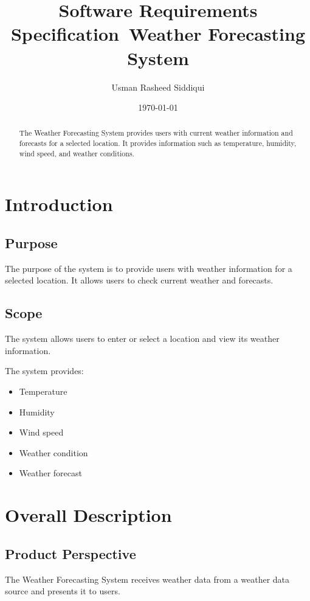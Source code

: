 \documentclass[12pt,a4paper]{article}
\title{Software Requirements Specification\
Weather Forecasting System}
\author{Usman Rasheed Siddiqui}
\date{\today}
\begin{document}
\maketitle

\begin{abstract}
The Weather Forecasting System provides users with current weather
information and forecasts for a selected location. It provides information
such as temperature, humidity, wind speed, and weather conditions.
\end{abstract}

\section{Introduction}

\subsection{Purpose}

The purpose of the system is to provide users with weather information
for a selected location. It allows users to check current weather and
forecasts.

\subsection{Scope}

The system allows users to enter or select a location and view its
weather information.

The system provides:

\begin{itemize}
\item Temperature
\item Humidity
\item Wind speed
\item Weather condition
\item Weather forecast
\end{itemize}

\section{Overall Description}

\subsection{Product Perspective}

The Weather Forecasting System receives weather data from a weather
data source and presents it to users.
\end{document}
